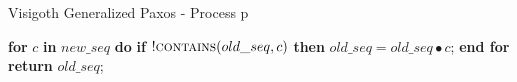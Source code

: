 \begin{algorithm}
\caption{Visigoth Generalized Paxos - Process p}
\begin{algorithmic}[1]
	
	\State \textbf{for} $c$ \textbf{in} $new\_seq$ \textbf{do} 
	\State \hspace{\algorithmicindent} \textbf{if} $!\Call{contains}{old\_seq,c}$ \textbf{then}
	\State \hspace{\algorithmicindent}\hspace{\algorithmicindent}\hspace{\algorithmicindent} $old\_seq =  old\_seq \bullet c$;
	\State \textbf{end for}
	\State \textbf{return} $old\_seq$;
	\EndFunction
\end{algorithmic}
\end{algorithm}


